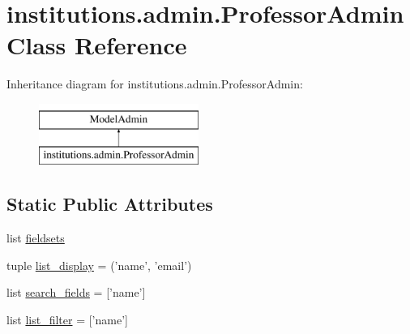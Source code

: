 \hypertarget{classinstitutions_1_1admin_1_1_professor_admin}{\section{institutions.\-admin.\-Professor\-Admin Class Reference}
\label{classinstitutions_1_1admin_1_1_professor_admin}
}
Inheritance diagram for institutions.\-admin.\-Professor\-Admin\-:\begin{figure}[H]
\begin{center}
\leavevmode
\includegraphics[height=2.000000cm]{classinstitutions_1_1admin_1_1_professor_admin}
\end{center}
\end{figure}
\subsection*{Static Public Attributes}
\begin{DoxyCompactItemize}
\item 
list \hyperlink{classinstitutions_1_1admin_1_1_professor_admin_ab8a36b5a7c915b445a01b0213419f7b1}{fieldsets}
\item 
tuple \hyperlink{classinstitutions_1_1admin_1_1_professor_admin_a1e05c20cab9819334f788a443b44c9ac}{list\-\_\-display} = ('name', 'email')
\item 
list \hyperlink{classinstitutions_1_1admin_1_1_professor_admin_ab57e3a1e6cc7c5f59cc1ee7a71fff83f}{search\-\_\-fields} = \mbox{[}'name'\mbox{]}
\item 
list \hyperlink{classinstitutions_1_1admin_1_1_professor_admin_a5bd32c5a1ddf6aff67d94dc82acb52f4}{list\-\_\-filter} = \mbox{[}'name'\mbox{]}
\end{DoxyCompactItemize}


